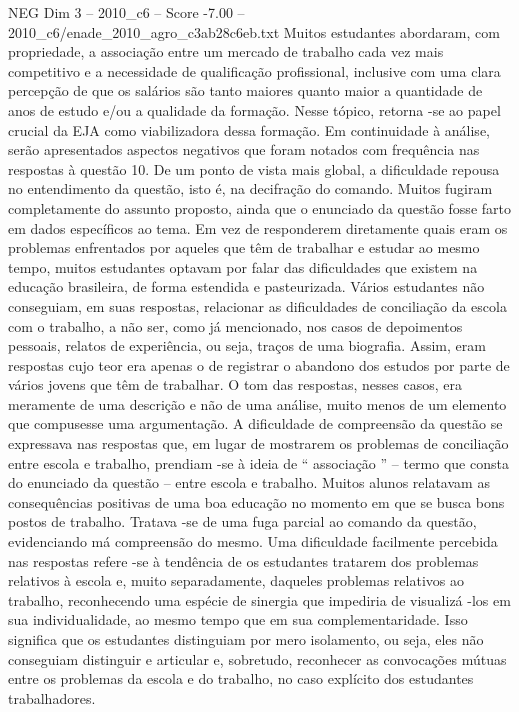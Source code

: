 \begin{textsample}{NEG Dim 3 – 2010\_c6 – Score -7.00 – 2010\_c6/enade\_2010\_agro\_c3ab28c6eb.txt}
Muitos estudantes abordaram, com propriedade, a associação entre um mercado de trabalho cada vez mais competitivo e a necessidade de qualificação profissional, inclusive com uma clara percepção de que os salários são tanto maiores quanto maior a quantidade de anos de estudo e/ou a qualidade da formação.
Nesse tópico, retorna -se ao papel crucial da EJA como viabilizadora dessa formação.
Em continuidade à análise, serão apresentados aspectos negativos que foram notados com frequência nas respostas à questão 10.
De um ponto de vista mais global, a dificuldade repousa no entendimento da questão, isto é, na decifração do comando.
Muitos fugiram completamente do assunto proposto, ainda que o enunciado da questão fosse farto em dados específicos ao tema.
Em vez de responderem diretamente quais eram os problemas enfrentados por aqueles que têm de trabalhar e estudar ao mesmo tempo, muitos estudantes optavam por falar das dificuldades que existem na educação brasileira, de forma estendida e pasteurizada.
Vários estudantes não conseguiam, em suas respostas, relacionar as dificuldades de conciliação da escola com o trabalho, a não ser, como já mencionado, nos casos de depoimentos pessoais, relatos de experiência, ou seja, traços de uma biografia.
Assim, eram respostas cujo teor era apenas o de registrar o abandono dos estudos por parte de vários jovens que têm de trabalhar.
O tom das respostas, nesses casos, era meramente de uma descrição e não de uma análise, muito menos de um elemento que compusesse uma argumentação.
A dificuldade de compreensão da questão se expressava nas respostas que, em lugar de mostrarem os problemas de conciliação entre escola e trabalho, prendiam -se à ideia de “ associação ” – termo que consta do enunciado da questão – entre escola e trabalho.
Muitos alunos relatavam as consequências positivas de uma boa educação no momento em que se busca bons postos de trabalho.
Tratava -se de uma fuga parcial ao comando da questão, evidenciando má compreensão do mesmo.
Uma dificuldade facilmente percebida nas respostas refere -se à tendência de os estudantes tratarem dos problemas relativos à escola e, muito separadamente, daqueles problemas relativos ao trabalho, reconhecendo uma espécie de sinergia que impediria de visualizá -los em sua individualidade, ao mesmo tempo que em sua complementaridade.
Isso significa que os estudantes distinguiam por mero isolamento, ou seja, eles não conseguiam distinguir e articular e, sobretudo, reconhecer as convocações mútuas entre os problemas da escola e do trabalho, no caso explícito dos estudantes trabalhadores.

\end{textsample}
